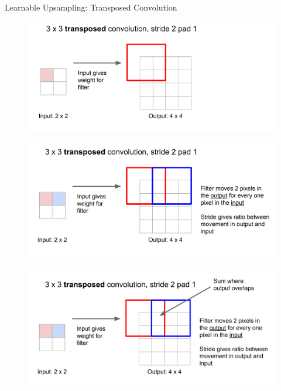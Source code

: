\begin{frame}[allowframebreaks]{Learnable Upsampling: Transposed Convolution}
\framebreak

\begin{figure}
\centering
\includegraphics[width=1.0\textwidth,height=1.0\textheight,keepaspectratio]{images/segmentation/upsample_6.png}
\end{figure}

\framebreak

\begin{figure}
\centering
\includegraphics[width=1.0\textwidth,height=1.0\textheight,keepaspectratio]{images/segmentation/upsample_7.png}
\end{figure}

\framebreak

\begin{figure}
\centering
\includegraphics[width=1.0\textwidth,height=1.0\textheight,keepaspectratio]{images/segmentation/upsample_8.png}
\end{figure}

\end{frame}